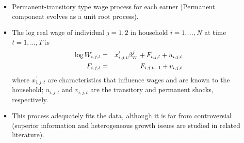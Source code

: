 \documentclass[notes=show]{beamer}
\begin{document}
\begin{frame}%


\begin{itemize}
\item Permanent-transitory type wage process for each earner (Permanent
component evolves as a unit root process).

\item The log real wage of individual $j=1,2$ in household $i=1,\ldots ,N$
at time $t=1,\ldots ,T$ is%
\begin{eqnarray}
\log W_{i,j,t} &=&x_{i,j,t}^{\prime }\beta _{W}^{j}+F_{i,j,t}+u_{i,j,t} \\
F_{i,j,t} &=&F_{i,j,t-1}+v_{i,j,t}  \notag
\end{eqnarray}%
where $x_{i,j,t}^{\prime }$ are characteristics that influence wages and are
known to the household; $u_{i,j,t}$ and $v_{i,j,t}$ are the transitory and
permanent shocks, respectively.

\item This process adequately fits the data, although it is far from
controversial (superior information and heterogeneous growth issues are
studied in related literature).
\end{itemize}

\transboxout%
\end{frame}%

\bigskip
\end{document}
